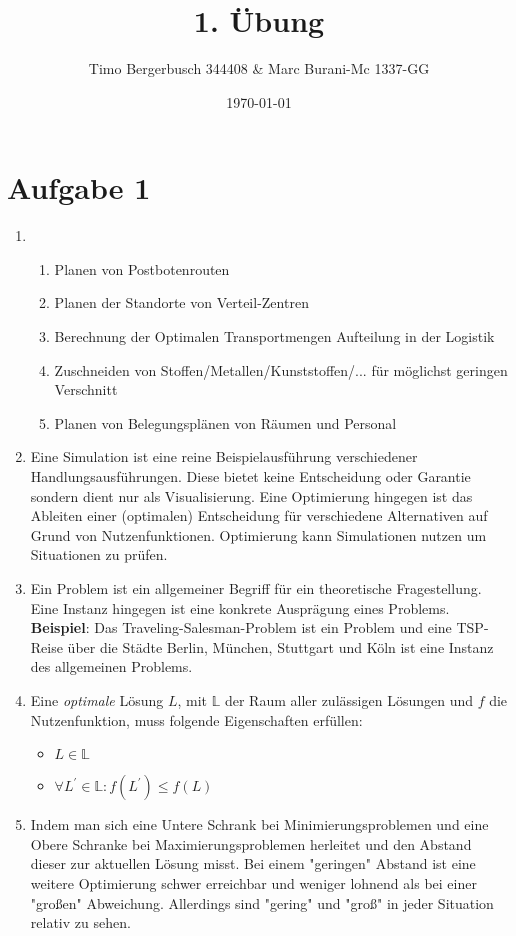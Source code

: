 \documentclass[12pt]{article}
\begin{document}
	
	\title{1. Übung}
	\author{Timo Bergerbusch 344408 \& Marc Burani-Mc 1337-GG}
	\date{\specialdate\today}
	\maketitle
	
	
	\section{Aufgabe 1}
	\begin{enumerate}[label=(\alph*)]
		\item \begin{enumerate}[label=(\roman*)] 
				\item Planen von Postbotenrouten
				\item Planen der Standorte von Verteil-Zentren
				\item Berechnung der Optimalen Transportmengen Aufteilung in der Logistik
				\item Zuschneiden von Stoffen/Metallen/Kunststoffen/... für möglichst geringen Verschnitt
				\item Planen von Belegungsplänen von Räumen und Personal
			\end{enumerate}
		\item Eine Simulation ist eine reine Beispielausführung verschiedener Handlungsausführungen. Diese bietet keine Entscheidung oder Garantie sondern dient nur als Visualisierung. \newline
		Eine Optimierung hingegen ist das Ableiten einer (optimalen) Entscheidung für verschiedene Alternativen auf Grund von Nutzenfunktionen. Optimierung kann Simulationen nutzen um Situationen zu prüfen.
		\item Ein Problem ist ein allgemeiner Begriff für ein theoretische Fragestellung. Eine Instanz hingegen ist eine konkrete Ausprägung eines Problems. \newline
		\textbf{Beispiel}: Das Traveling-Salesman-Problem ist ein Problem und eine TSP-Reise über die Städte Berlin, München, Stuttgart und Köln ist eine Instanz des allgemeinen Problems.
		\item Eine \textit{optimale} Lösung $L$, mit $\mathbb{L}$ der Raum aller zulässigen Lösungen und $f$ die Nutzenfunktion, muss folgende Eigenschaften erfüllen:
			\begin{itemize}
				\item $L \in \mathbb{L}$
				\item $\forall L^\prime \in \mathbb{L}: f(L^\prime) \le f(L)$
			\end{itemize}
		\item Indem man sich eine Untere Schrank bei Minimierungsproblemen und eine Obere Schranke bei Maximierungsproblemen herleitet und den Abstand dieser zur aktuellen Lösung misst. Bei einem "geringen" Abstand ist eine weitere Optimierung schwer erreichbar und weniger lohnend als bei einer "großen" Abweichung. Allerdings sind "gering" und "groß" in jeder Situation relativ zu sehen.
	\end{enumerate}
\end{document}
